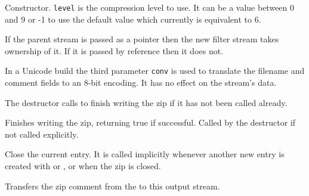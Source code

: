 

\label{wxzipoutputstreamwxzipoutputstream}



Constructor. {\tt level} is the compression level to use.
It can be a value between 0 and 9 or -1 to use the default value
which currently is equivalent to 6.

If the parent stream is passed as a pointer then the new filter stream
takes ownership of it. If it is passed by reference then it does not.

In a Unicode build the third parameter {\tt conv} is used to translate
the filename and comment fields to an 8-bit encoding. It has no effect on the
stream's data.


\label{wxzipoutputstreamdtor}


The destructor calls  to finish
writing the zip if it has not been called already.


\label{wxzipoutputstreamclose}


Finishes writing the zip, returning true if successful.
Called by the destructor if not called explicitly.


\label{wxzipoutputstreamcloseentry}


Close the current entry. It is called implicitly whenever another new
entry is created with 
or , or
when the zip is closed.


\label{wxzipoutputstreamcopyarchivemetadata}


Transfers the zip comment from the 
to this output stream.


